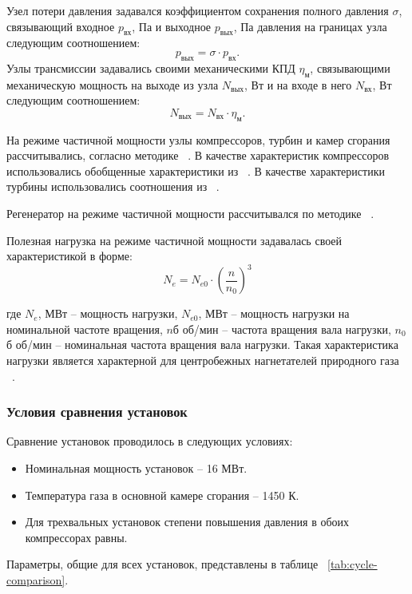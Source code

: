 Узел потери давления задавался коэффициентом сохранения полного давления $\sigma$, связывающий входное $p_{вх}$, Па и выходное $p_{вых}$, Па давления на границах узла следующим соотношением:
$$
	p_{вых} = \sigma \cdot p_{вх}.
$$
Узлы трансмиссии задавались своими механическими КПД $\eta_м$, связывающими механическую мощность на выходе из узла $N_{вых}$, Вт и на входе в него $N_{вх}$, Вт следующим соотношением:
$$
	N_{вых} = N_{вх} \cdot \eta_м.
$$

На режиме частичной мощности узлы компрессоров, турбин и камер сгорания рассчитывались, согласно методике ~\cite{shlyakhtenko}.
В качестве характеристик компрессоров использовались обобщенные характеристики из ~\cite{comp_char}.
В качестве характеристики турбины использовались соотношения из ~.

Регенератор на режиме частичной мощности рассчитывался по методике ~\cite{heat_exchangers}.

Полезная нагрузка на режиме частичной мощности задавалась своей характеристикой в форме:
$$
	N_e = N_{e0} \cdot \left( \frac{n}{n_0} \right)^3
$$

где $N_e$, МВт – мощность нагрузки, $N_{e0}$, МВт – мощность нагрузки на номинальной частоте вращения,  $n$б об/мин –
частота вращения вала нагрузки, $n_0$б об/мин – номинальная частота вращения вала нагрузки. Такая характеристика нагрузки
является характерной для центробежных нагнетателей природного газа ~\cite{radial_compressors}.

\subsubsection{Условия сравнения установок}

Сравнение установок проводилось в следующих условиях:
\begin{itemize}
	\item Номинальная мощность установок – 16 МВт.
	\item Температура газа в основной камере сгорания – 1450 К.
	\item Для трехвальных установок степени повышения давления в обоих компрессорах равны.
\end{itemize}

Параметры, общие для всех установок, представлены в таблице ~\ref{tab:cycle-comparison}.

